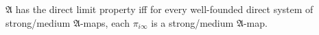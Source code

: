 $\mathfrak{A}$ has the direct limit property iff for every well-founded direct system of strong/medium $\mathfrak{A}$-maps, each $\pi_{i\infty}$ is a strong/medium $\mathfrak{A}$-map.
